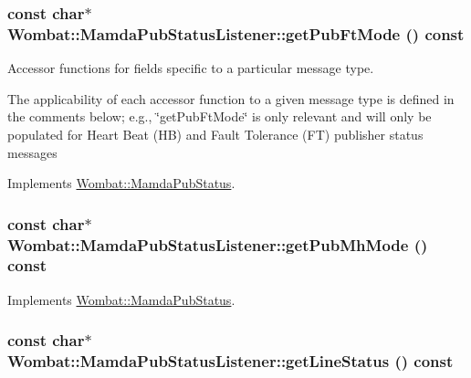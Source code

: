 \hypertarget{classWombat_1_1MamdaPubStatusListener_1015e3575a3a8473801927af37687d66}{
\subsubsection[getPubFtMode]{\setlength{\rightskip}{0pt plus 5cm}const char$\ast$ Wombat::Mamda\-Pub\-Status\-Listener::get\-Pub\-Ft\-Mode () const}}
\label{classWombat_1_1MamdaPubStatusListener_1015e3575a3a8473801927af37687d66}


Accessor functions for fields specific to a particular message type. 

The applicability of each accessor function to a given message type is defined in the comments below; e.g., \char`\"{}get\-Pub\-Ft\-Mode\char`\"{} is only relevant and will only be populated for Heart Beat (HB) and Fault Tolerance (FT) publisher status messages 

Implements \hyperlink{classWombat_1_1MamdaPubStatus_11e1cacd11604090bf1c5387b0ac7f43}{Wombat::Mamda\-Pub\-Status}.\hypertarget{classWombat_1_1MamdaPubStatusListener_2cec9d2c120cdf4cfaab88ef273712aa}{
\subsubsection[getPubMhMode]{\setlength{\rightskip}{0pt plus 5cm}const char$\ast$ Wombat::Mamda\-Pub\-Status\-Listener::get\-Pub\-Mh\-Mode () const}}
\label{classWombat_1_1MamdaPubStatusListener_2cec9d2c120cdf4cfaab88ef273712aa}




Implements \hyperlink{classWombat_1_1MamdaPubStatus_e79db14a783d2831413c89f1e3c4527e}{Wombat::Mamda\-Pub\-Status}.\hypertarget{classWombat_1_1MamdaPubStatusListener_6a41fa38621e9165330688951656e3c3}{
\subsubsection[getLineStatus]{\setlength{\rightskip}{0pt plus 5cm}const char$\ast$ Wombat::Mamda\-Pub\-Status\-Listener::get\-Line\-Status () const}}
\label{classWombat_1_1MamdaPubStatusListener_6a41fa38621e9165330688951656e3c3}




